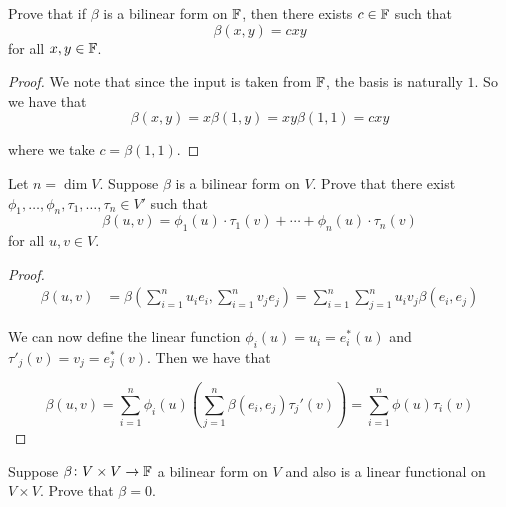 \documentclass{extarticle}
\begin{document}

\newpage
{}
\begin{problem}{1}
    Prove that if \(\beta\) is a bilinear form on \(\mathbb{F}\), then there exists \(c \in \mathbb{F}\) such that 
    \[\beta (x, y) = c xy\]
    for all \(x, y \in \mathbb{F}\).
\end{problem}

\begin{proof}
We note that since the input is taken from \(\mathbb{F}\), the basis is naturally \(1\). So we have that 
\[\beta(x, y) = x \beta(1, y) = xy \beta(1,1) = c xy\]

where we take \(c = \beta(1,1)\). 
\end{proof}

\begin{problem}{2}
    Let \(n = \dim V\). Suppose \(\beta\) is a bilinear form on \(V\). Prove that there exist 
    \(\phi_1, \ldots, \phi_n, \tau_1, \ldots, \tau_n \in V'\) such that 
    \[\beta(u, v) = \phi_1(u) \cdot \tau_1(v) + \cdots + \phi_n (u) \cdot \tau_n (v)\]
    for all \(u, v \in V\). 
\end{problem}

\begin{proof}
\begin{align*}
    \beta(u, v) 
    &= \beta \left(\sum_{i=1}^{n} u_i e_i, \sum_{i=1}^{n} v_j e_j\right) 
    = \sum_{i=1}^{n} \sum_{j=1}^{n} u_i v_j \beta(e_i, e_j)
\end{align*}

We can now define the linear function \(\phi_i (u) = u_i = e_i^*(u)\) and 
\(\tau'_j(v) = v_j = e_j^*(v)\). Then we have that 

\[\beta(u, v) = \sum_{i=1}^{n} \phi_i(u) \left( \sum_{j=1}^{n} \beta(e_i, e_j) \tau_j'(v) \right) 
= \sum_{i=1}^{n} \phi(u) \tau_i(v)\]
\end{proof}

\begin{problem}{3}
    Suppose \(\beta \colon V \times V \to \mathbb{F}\) a bilinear form on \(V\) and also is a linear functional 
    on \(V \times V\). Prove that \(\beta = 0\).
\end{problem}
\end{document}
